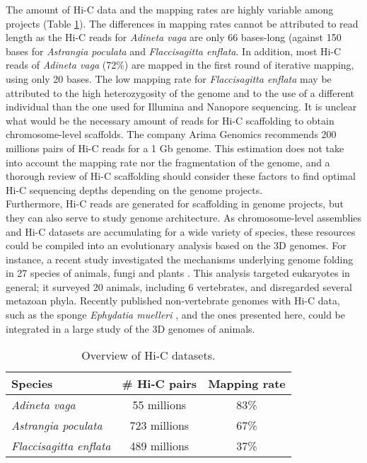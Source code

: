 The amount of Hi-C data and the mapping rates are highly variable among projects (Table \ref{tab:hic_data}). The differences in mapping rates cannot be attributed to read length as the Hi-C reads for \textit{Adineta vaga} are only 66 bases-long (against 150 bases for \textit{Astrangia poculata} and \textit{Flaccisagitta enflata}. In addition, most Hi-C reads of \textit{Adineta vaga} (72\%) are mapped in the first round of iterative mapping, using only 20 bases. The low mapping rate for \textit{Flaccisagitta enflata} may be attributed to the high heterozygosity of the genome and to the use of a different individual than the one used for Illumina and Nanopore sequencing. It is unclear what would be the necessary amount of reads for Hi-C scaffolding to obtain chromosome-level scaffolds. The company Arima Genomics recommends 200 millions pairs of Hi-C reads for a 1 Gb genome. This estimation does not take into account the mapping rate nor the fragmentation of the genome, and a thorough review of Hi-C scaffolding should consider these factors to find optimal Hi-C sequencing depths depending on the genome projects. \\

Furthermore, Hi-C reads are generated for scaffolding in genome projects, but they can also serve to study genome architecture. As chromosome-level assemblies and Hi-C datasets are accumulating for a wide variety of species, these resources could be compiled into an evolutionary analysis based on the 3D genomes. For instance, a recent study investigated the mechanisms underlying genome folding in 27 species of animals, fungi and plants \cite{hic_genomes}. This analysis targeted eukaryotes in general; it surveyed 20 animals, including 6 vertebrates, and disregarded several metazoan phyla. Recently published non-vertebrate genomes with Hi-C data, such as the sponge \textit{Ephydatia muelleri} \cite{ephydatia_mulleri}, and the ones presented here, could be integrated in a large study of the 3D genomes of animals. \\

\begin{table}
\centering
\begin{tabular}{lcc}
\hline
\textbf{Species} & \textbf{\# Hi-C pairs} & \textbf{Mapping rate} \\
\hline
\textit{Adineta vaga} & 55 millions & 83\% \\
\textit{Astrangia poculata} & 723 millions & 67\% \\
\textit{Flaccisagitta enflata} & 489 millions & 37\% \\
\hline
\end{tabular}
\caption{Overview of Hi-C datasets.}
\label{tab:hic_data}
\end{table}

